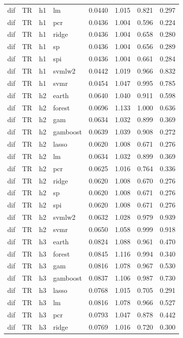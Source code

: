 \begin{ThreePartTable}
\begin{longtable}[t]{llclcccc}
dif & TR & h1 & lm & 0.0440 & 1.015 & 0.821 & 0.297\\
dif & TR & h1 & pcr & 0.0436 & 1.004 & 0.596 & 0.224\\
dif & TR & h1 & ridge & 0.0436 & 1.004 & 0.658 & 0.280\\
dif & TR & h1 & sp & 0.0436 & 1.004 & 0.656 & 0.289\\
dif & TR & h1 & spi & 0.0436 & 1.004 & 0.661 & 0.284\\
dif & TR & h1 & svmlw2 & 0.0442 & 1.019 & 0.966 & 0.832\\
dif & TR & h1 & svmr & 0.0454 & 1.047 & 0.995 & 0.785\\
\addlinespace
dif & TR & h2 & earth & 0.0640 & 1.040 & 0.911 & 0.598\\
dif & TR & h2 & forest & 0.0696 & 1.133 & 1.000 & 0.636\\
dif & TR & h2 & gam & 0.0634 & 1.032 & 0.899 & 0.369\\
dif & TR & h2 & gamboost & 0.0639 & 1.039 & 0.908 & 0.272\\
dif & TR & h2 & lasso & 0.0620 & 1.008 & 0.671 & 0.276\\
dif & TR & h2 & lm & 0.0634 & 1.032 & 0.899 & 0.369\\
dif & TR & h2 & pcr & 0.0625 & 1.016 & 0.764 & 0.336\\
dif & TR & h2 & ridge & 0.0620 & 1.008 & 0.670 & 0.276\\
dif & TR & h2 & sp & 0.0620 & 1.008 & 0.671 & 0.276\\
dif & TR & h2 & spi & 0.0620 & 1.008 & 0.671 & 0.276\\
dif & TR & h2 & svmlw2 & 0.0632 & 1.028 & 0.979 & 0.939\\
dif & TR & h2 & svmr & 0.0650 & 1.058 & 0.999 & 0.918\\
\addlinespace
dif & TR & h3 & earth & 0.0824 & 1.088 & 0.961 & 0.470\\
dif & TR & h3 & forest & 0.0845 & 1.116 & 0.994 & 0.340\\
dif & TR & h3 & gam & 0.0816 & 1.078 & 0.967 & 0.530\\
dif & TR & h3 & gamboost & 0.0837 & 1.106 & 0.987 & 0.730\\
dif & TR & h3 & lasso & 0.0768 & 1.015 & 0.705 & 0.291\\
dif & TR & h3 & lm & 0.0816 & 1.078 & 0.966 & 0.527\\
dif & TR & h3 & pcr & 0.0793 & 1.047 & 0.878 & 0.442\\
dif & TR & h3 & ridge & 0.0769 & 1.016 & 0.720 & 0.300\\

\end{longtable}
\end{ThreePartTable}
